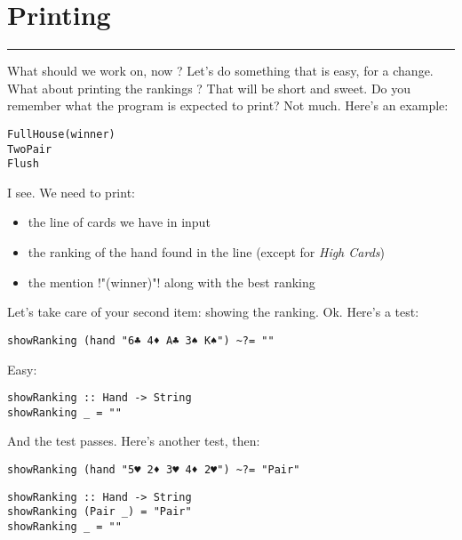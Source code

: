\newpage
\section{Printing} 
\vspace{10cm}
\hrule

\lhQ What should we work on, now ?
\lhA Let's do something that is easy, for a change.
\lhN What about printing the rankings ?
\lhA That will be short and sweet.
\lhN Do you remember what the program is expected to print?
\lhA Not much.
\lhN Here's an example:
\begin{alltt}
       Full House (winner)
       Two Pair
      
  
       Flush
     
\end{alltt}
\lhA I see. We need to print:
\begin{itemize}
\item the line of cards we have in input
\item the ranking of the hand found in the line (except for \emph{High Cards})
\item the mention \il!"(winner)"! along with the best ranking
\end{itemize}
\hspace*{\fill}\vspace*{\fill}
\lhN Let's take care of your second item: showing the ranking.
\lhA Ok.
\lhN  Here's a test:
\begin{lstlisting}[frame=single]
showRanking (hand "6♣ 4♦ A♣ 3♠ K♠") ~?= ""
\end{lstlisting}
\lhA Easy:
\begin{lstlisting}[frame=single]
showRanking :: Hand -> String
showRanking _ = ""
\end{lstlisting}
\success And the test passes.
\lhN Here's another test, then:
\begin{lstlisting}[frame=single]
showRanking (hand "5♥ 2♦ 3♥ 4♦ 2♥") ~?= "Pair"
\end{lstlisting}
\lhA 
\begin{lstlisting}[frame=single]
showRanking :: Hand -> String
showRanking (Pair _) = "Pair"
showRanking _ = ""
\end{lstlisting}
